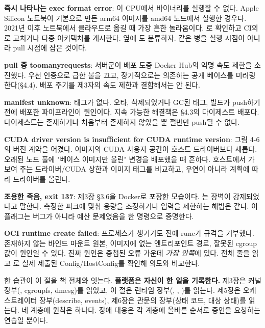 \begin{tbbitemize}
  \item \textbf{즉시 나타나는 exec format error}: 이 CPU에서 바이너리를 실행할 수 없다. Apple Silicon 노트북이 기본으로 만든 arm64 이미지를 amd64 노드에서 실행한 경우다. 2021년 이후 노트북에서 클라우드로 옮길 때 가장 흔한 놀라움이다. 로 확인하고 CI의 로 고치거나 다중 아키텍처를 게시한다. 옆에 도 분류하자. 같은 병을 실행 시점이 아니라 pull 시점에 잡은 것이다.
  \item \textbf{pull 중 toomanyrequests}: 서버군이 배포 도중 Docker Hub의 익명 속도 제한을 소진했다. 우선 인증으로 급한 불을 끄고, 장기적으로는 의존하는 공개 베이스를 미러링한다(§4.4). 배포 주기를 제3자의 속도 제한과 결합해서는 안 된다.
  \item \textbf{manifest unknown}: 태그가 없다. 오타, 삭제되었거나 GC된 태그, 빌드가 push하기 전에 배포한 파이프라인이 원인이다. 지속 가능한 해결책은 §4.3의 다이제스트 배포다. 다이제스트는 존재하거나 처음부터 존재하지 않았을 뿐 절반만 push될 수 없다.
  \item \textbf{CUDA driver version is insufficient for CUDA runtime version}: 그림 4-6의 버전 계약을 어겼다. 이미지의 CUDA 사용자 공간이 호스트 드라이버보다 새롭다. 오래된 노드 풀에 "베이스 이미지만 올린" 변경을 배포했을 때 흔하다. 호스트에서 가 보여 주는 드라이버/CUDA 상한과 이미지 태그를 비교하고, 우연이 아니라 계획에 따라 드라이버를 올린다.
  \item \textbf{조용한 죽음, exit 137}: 제3장 §3.6을 Docker로 포장한 모습이다. 는  장벽이 강제되었다고 말한다. 측정한 피크에 맞춰 용량을 조정하거나 입력을 제한하는 해법은 같다. 이 플래그는 버그가 아니라 예산 문제였음을 한 명령으로 증명한다.
  \item \textbf{OCI runtime create failed}: 프로세스가 생기기도 전에 runc가 규격을 거부했다. 존재하지 않는 바인드 마운트 원본, 이미지에 없는 엔트리포인트 경로, 잘못된 cgroup 값이 원인일 수 있다. 진짜 원인은 중첩된 오류 가운데 \textit{가장 안쪽}에 있다. 전체 줄을 읽고 로 실제 제출된 Config/HostConfig를 확인해 의도와 비교한다.
\end{tbbitemize}

한 습관이 이 절을 책 전체와 잇는다. \textbf{플랫폼은 자신이 한 일을 기록한다.} 제3장은 커널 장부(, cgroupfs, dmesg)를 읽었고, 이 절은 런타임 장부(, , )를 읽는다. 제5장은 오케스트레이터 장부(describe, events), 제6장은 관문의 장부(상태 코드, 대상 상태)를 읽는다. 네 계층에 원칙은 하나다. 장애 대응은 각 계층에 올바른 순서로 증언을 요청하는 연습일 뿐이다.

